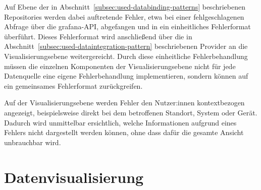 Auf Ebene der in Abschnitt~\ref{subsec:used-databinding-patterns} beschriebenen Repositories
werden dabei auftretende Fehler, etwa bei einer fehlgeschlagenen Abfrage über die
\gls{grafana}-API, abgefangen und in ein einheitliches Fehlerformat überführt. Dieses
Fehlerformat wird anschließend über die in Abschnitt~\ref{subsec:used-dataintegration-pattern}
beschriebenen Provider an die Visualisierungsebene weitergereicht. Durch diese einheitliche
Fehlerbehandlung müssen die einzelnen Komponenten der Visualisierungsebene nicht für jede
Datenquelle eine eigene Fehlerbehandlung implementieren, sondern können auf ein gemeinsames
Fehlerformat zurückgreifen.

Auf der Visualisierungsebene werden Fehler den Nutzer:innen kontextbezogen angezeigt,
beispielsweise direkt bei dem betroffenen Standort, System oder Gerät. Dadurch wird
unmittelbar ersichtlich, welche Informationen aufgrund eines Fehlers nicht dargestellt
werden können, ohne dass dafür die gesamte Ansicht unbrauchbar wird.

\section{Datenvisualisierung}
\label{sec:data-visualization}